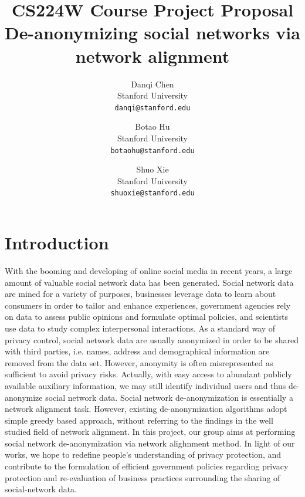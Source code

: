\documentclass[11pt,letterpaper]{article}
\begin{document}
\title{{CS224W Course Project Proposal \\} \bf De-anonymizing social networks via network alignment}

\author{Danqi Chen\\
Stanford University\\
{\tt\small danqi@stanford.edu}
\and
Botao Hu\\
Stanford University\\
{\tt\small botaohu@stanford.edu}
%
\and
Shuo Xie\\
Stanford University\\
{\tt\small shuoxie@stanford.edu}
}

\maketitle
\thispagestyle{empty}

\maketitle



\section{Introduction}
With the booming and developing of online social media in recent years, a large amount of valuable social network data has been generated. Social network data are mined for a variety of purposes, businesses leverage data to learn about consumers in order to tailor and enhance experiences, government agencies rely on data to assess public opinions and formulate optimal policies, and scientists use data to study complex interpersonal interactions. 
As a standard way of privacy control, social network data are usually anonymized in order to be shared with third parties, i.e. names, address and demographical information are removed from the data set. However, anonymity is often misrepresented as sufficient to avoid privacy risks. Actually, with easy access to abundant publicly available auxiliary information, we may still identify individual users and thus de-anonymize social network data.
Social network de-anonymization is essentially  a network alignment task. However, existing de-anonymization algorithms adopt simple greedy based approach, without referring to the findings in the well studied field of network alignment. In this project, our group aims at performing social network de-anonymization via network alighnment method. In light of our works, we hope to redefine people’s understanding of privacy protection, and contribute to the formulation of efficient government policies regarding privacy protection and re-evaluation of business practices surrounding the sharing of social-network data.
\end{document}
